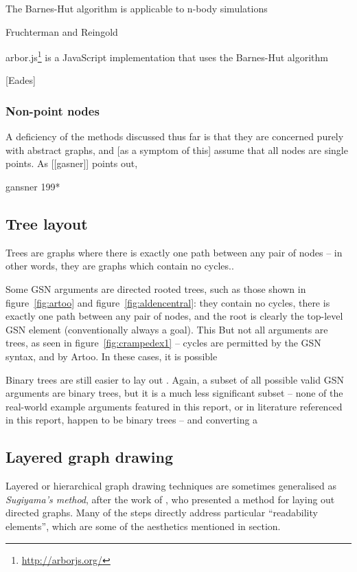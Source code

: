 The Barnes-Hut algorithm is applicable to n-body simulations \citet{quigleyfade} 

Fruchterman and Reingold 

arbor.js\footnote{\url{http://arborjs.org/}} is a JavaScript implementation that uses the Barnes-Hut algorithm 

[Eades]

\citet{handbook:forcedir}

\subsubsection{Non-point nodes}

A deficiency of the methods discussed thus far is that they are concerned purely with abstract graphs, and [as a symptom of this] assume that all nodes are single points. As [[gasner]] points out, 


gansner 199*




\subsection{Tree layout}

Trees are graphs where there is exactly one path between any pair of nodes -- in other words, they are graphs which contain no cycles..

Some GSN arguments are directed rooted trees, such as those shown in figure~\ref{fig:artoo} and figure~\ref{fig:aldencentral}: they contain no cycles, there is exactly one path between any pair of nodes, and the root is clearly the top-level GSN element (conventionally always a goal).
This 
But not all arguments are trees, as seen in figure~\ref{fig:crampedex1} -- cycles are permitted by the GSN syntax, and by Artoo. In these cases, it is possible 

Binary trees are still easier to lay out \cite{handbook:tree}. Again, a subset of all possible valid GSN arguments are binary trees, but it is a much less significant subset -- none of the real-world example arguments featured in this report, or in literature referenced in this report, happen to be binary trees -- and converting a 


\subsection{Layered graph drawing}

Layered or hierarchical graph drawing techniques are sometimes generalised as \emph{Sugiyama's method}, after the work of \citet{4308636}, who presented a method for laying out directed graphs. Many of the steps directly address particular ``readability elements'', which are some of the aesthetics mentioned in section.

